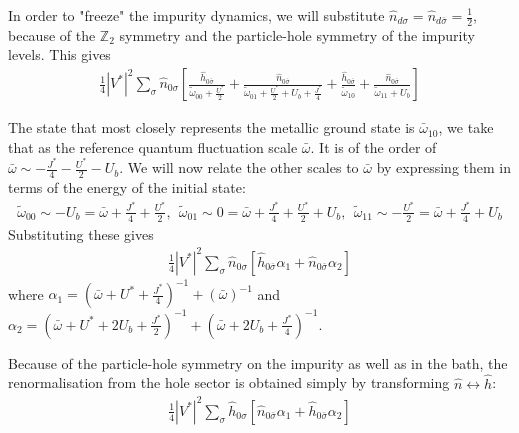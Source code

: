 \documentclass{report}
\numberwithin{equation}{section}
\begin{document}
In order to "freeze" the impurity dynamics, we will substitute \(\hat n_{d\sigma} = \hat n_{d\bar\sigma} = \frac{1}{2}\), because of the \(\mathbb{Z}_2\) symmetry and the particle-hole symmetry of the impurity levels. This gives
\begin{equation}\begin{aligned}
	\frac{1}{4}|V^*|^2 \sum_\sigma \hat n_{0\sigma} \left[\frac{\hat h_{0\bar\sigma}}{\tilde\omega_{00} + \frac{U^*}{2}} + \frac{\hat n_{0\bar\sigma}}{\tilde\omega_{01} + \frac{U^*}{2} + U_b + \frac{J^*}{4}} + \frac{\hat h_{0\bar\sigma}}{\tilde\omega_{10}} + \frac{\hat n_{0\bar\sigma}}{\tilde\omega_{11} + U_b}\right]
\end{aligned}\end{equation}

The state that most closely represents the metallic ground state is \(\bar \omega_{10}\), we take that as the reference quantum fluctuation scale \(\bar\omega\). It is of the order of \(\bar\omega \sim -\frac{J^*}{4} - \frac{U^*}{2} - U_b\). We will now relate the other scales to \(\bar\omega\) by expressing them in terms of the energy of the initial state:
\begin{equation}\begin{aligned}
	\tilde\omega_{00} \sim -U_b = \bar\omega + \frac{J^*}{4} + \frac{U^*}{2}, ~~ \tilde\omega_{01} \sim 0 = \bar\omega + \frac{J^*}{4} + \frac{U^*}{2} + U_b, ~~ \tilde\omega_{11} \sim -\frac{U^*}{2} = \bar\omega + \frac{J^*}{4} + U_b
\end{aligned}\end{equation}
Substituting these gives
\begin{equation}\begin{aligned}
	\frac{1}{4}|V^*|^2 \sum_\sigma \hat n_{0\sigma} \left[\hat h_{0\bar\sigma}\alpha_1 + \hat n_{0\bar\sigma}\alpha_2\right]
\end{aligned}\end{equation}
where \(\alpha_1 = \left(\bar\omega + U^* + \frac{J^*}{4}\right)^{-1} + \left(\bar\omega\right)^{-1}\) and \(\alpha_2 = \left(\bar\omega + U^* + 2U_b + \frac{J^*}{2}\right)^{-1} + \left(\bar\omega + 2U_b + \frac{J^*}{4}\right)^{-1}\).

Because of the particle-hole symmetry on the impurity as well as in the bath, the renormalisation from the hole sector is obtained simply by transforming \(\hat n \leftrightarrow \hat h\):
\begin{equation}\begin{aligned}
	\frac{1}{4}|V^*|^2 \sum_\sigma \hat h_{0\sigma} \left[\hat n_{0\bar\sigma}\alpha_1 + \hat h_{0\bar\sigma}\alpha_2\right]
\end{aligned}\end{equation}
\end{document}
